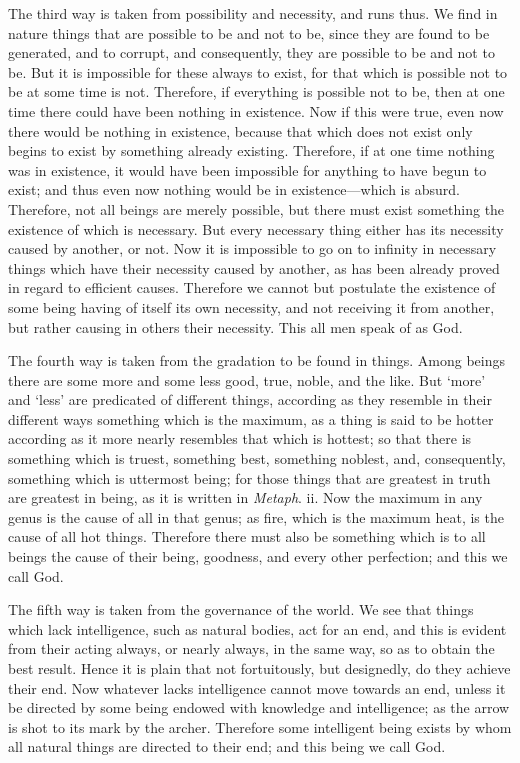 The third way is taken from possibility and necessity, and runs thus.
We find in nature things that are possible to be and not to be, since
they are found to be generated, and  to corrupt, and
consequently, they are possible to be and not to be. But it is
impossible for these always to exist, for that which is possible not
to be at some time is not. Therefore, if everything is possible not
to be, then at one time there could have been nothing in existence.
Now if this were true, even now there would be nothing in existence,
because that which does not exist only begins to exist by something
already existing. Therefore, if at one time nothing was in
existence, it would have been impossible for anything to have begun to
exist; and thus even now nothing would be in existence---which is
absurd. Therefore, not all beings are merely possible, but there must
exist something the existence of which is necessary. But every
necessary thing either has its necessity caused by another, or not.
Now it is impossible to go on to infinity in necessary things which
have their necessity caused by another, as has been already proved in
regard to efficient causes. Therefore we cannot but postulate the
existence of some being having of itself its own necessity, and not
receiving it from another, but rather causing in others their
necessity. This all men speak of as God.

The fourth way is taken from the gradation to be found in things.
Among beings there are some more and some less good, true, noble, and
the like. But `more' and `less' are predicated of different things,
according as they resemble in their different ways something which is
the maximum, as a thing is said to be hotter according as it more
nearly resembles that which is hottest; so that there is something
which is truest, something best, something noblest, and, consequently,
something which is uttermost being; for those things that are greatest
in truth are greatest in being, as it is written in \textit{Metaph}.
ii. Now the maximum in any genus is the cause of all in that genus; as
fire, which is the maximum heat, is the cause of all hot things.
Therefore there must also be something which is to all beings the
cause of their being, goodness, and every other perfection; and this
we call God.

The fifth way is taken from the governance of the world.  We
see that things which lack intelligence, such as natural bodies, act
for an end, and this is evident from their acting always, or nearly
always, in the same way, so as to obtain the best result. Hence it
is plain that not fortuitously, but designedly, do they achieve their
end. Now whatever lacks intelligence cannot move towards an end,
unless it be directed by some being endowed with knowledge and
intelligence; as the arrow is shot to its mark by the archer.
Therefore some intelligent being exists by whom all natural things are
directed to their end; and this being we call God.

